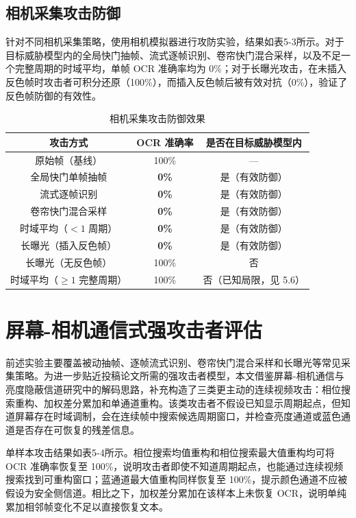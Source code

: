 \subsection{相机采集攻击防御}

针对不同相机采集策略，使用相机模拟器进行攻防实验，结果如表5-3所示。对于目标威胁模型内的全局快门抽帧、流式逐帧识别、卷帘快门混合采样，以及不足一个完整周期的时域平均，单帧 OCR 准确率均为 0\%；对于长曝光攻击，在未插入反色帧时攻击者可积分还原（100\%），而插入反色帧后被有效对抗（0\%），验证了反色帧防御的有效性。

\begin{table}[htbp]
  \centering
  \caption{相机采集攻击防御效果}
  \begin{tabular}{ccc}
    \toprule
    攻击方式 & OCR 准确率 & 是否在目标威胁模型内 \\
    \midrule
    原始帧（基线） & 100\% & — \\
    全局快门单帧抽帧 & \textbf{0\%} & 是（有效防御） \\
    流式逐帧识别 & \textbf{0\%} & 是（有效防御） \\
    卷帘快门混合采样 & \textbf{0\%} & 是（有效防御） \\
    时域平均（$<1$ 周期） & \textbf{0\%} & 是（有效防御） \\
    长曝光（插入反色帧） & \textbf{0\%} & 是（有效防御） \\
    长曝光（无反色帧） & 100\% & 否 \\
    时域平均（$\ge 1$ 完整周期） & 100\% & 否（已知局限，见 5.6） \\
    \bottomrule
  \end{tabular}
\end{table}

\section{屏幕-相机通信式强攻击者评估}

前述实验主要覆盖被动抽帧、逐帧流式识别、卷帘快门混合采样和长曝光等常见采集策略。为进一步贴近投稿论文所需的强攻击者模型，本文借鉴屏幕-相机通信与亮度隐蔽信道研究中的解码思路，补充构造了三类更主动的连续视频攻击：相位搜索重构、加权差分累加和单通道重构。该类攻击者不假设已知显示周期起点，但知道屏幕存在时域调制，会在连续帧中搜索候选周期窗口，并检查亮度通道或蓝色通道是否存在可恢复的残差信息。

单样本攻击结果如表5-4所示。相位搜索均值重构和相位搜索最大值重构均可将 OCR 准确率恢复至 100\%，说明攻击者即使不知道周期起点，也能通过连续视频搜索找到可重构窗口；蓝通道最大值重构同样恢复至 100\%，提示颜色通道不应被假设为安全侧信道。相比之下，加权差分累加在该样本上未恢复 OCR，说明单纯累加相邻帧变化不足以直接恢复文本。

